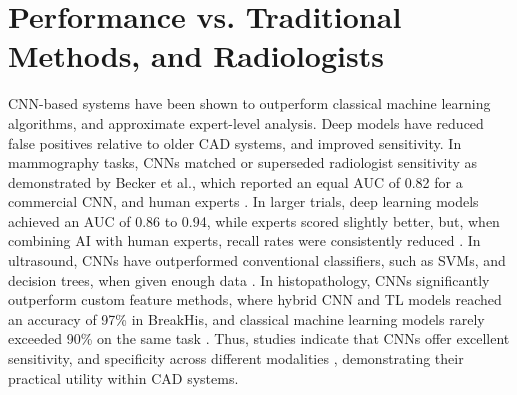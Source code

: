 \documentclass[../main]{subfiles}
\begin{document}
\section{Performance vs. Traditional Methods, and Radiologists}
\label{sec:performance}
CNN-based systems have been shown to outperform classical machine learning algorithms, and approximate expert-level analysis. Deep models have reduced false positives relative to older CAD systems, and improved sensitivity. In mammography tasks, CNNs matched or superseded radiologist sensitivity as demonstrated by Becker et al., which reported an equal AUC of 0.82 for a commercial CNN, and human experts \autocite{carriero2024deep}. In larger trials, deep learning models achieved an AUC of 0.86 to 0.94, while experts scored slightly better, but, when combining AI with human experts, recall rates were consistently reduced \autocite{carriero2024deep}. In ultrasound, CNNs have outperformed conventional classifiers, such as SVMs, and decision trees, when given enough data \autocite{yusoff2023accuracy}. In histopathology, CNNs significantly outperform custom feature methods, where hybrid CNN and TL models reached an accuracy of 97\% in BreakHis, and classical machine learning models rarely exceeded 90\% on the same task \autocite{yusoff2023accuracy}. Thus, studies indicate that CNNs offer excellent sensitivity, and specificity across different modalities \autocite{carriero2024deep} \autocite{wang2024mammography}, demonstrating their practical utility within CAD systems.
\end{document}
